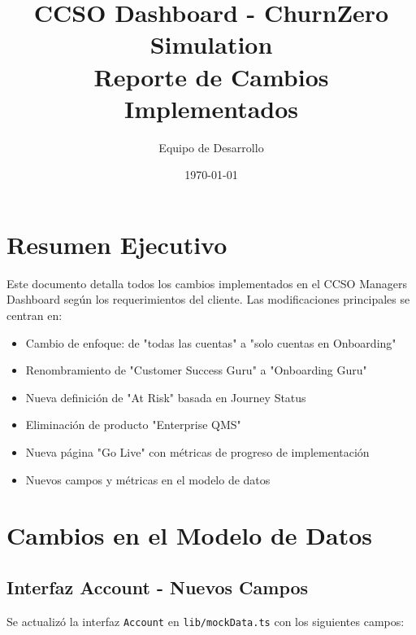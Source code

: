 \documentclass[12pt,a4paper]{article}
\title{\textbf{CCSO Dashboard - ChurnZero Simulation} \\ \large Reporte de Cambios Implementados}
\author{Equipo de Desarrollo}
\date{\today}
\begin{document}
\maketitle
\newpage

\tableofcontents
\newpage

\section{Resumen Ejecutivo}

Este documento detalla todos los cambios implementados en el CCSO Managers Dashboard según los requerimientos del cliente. Las modificaciones principales se centran en:

\begin{itemize}
    \item Cambio de enfoque: de "todas las cuentas" a "solo cuentas en Onboarding"
    \item Renombramiento de "Customer Success Guru" a "Onboarding Guru"
    \item Nueva definición de "At Risk" basada en Journey Status
    \item Eliminación de producto "Enterprise QMS"
    \item Nueva página "Go Live" con métricas de progreso de implementación
    \item Nuevos campos y métricas en el modelo de datos
\end{itemize}

\section{Cambios en el Modelo de Datos}

\subsection{Interfaz Account - Nuevos Campos}

Se actualizó la interfaz \texttt{Account} en \texttt{lib/mockData.ts} con los siguientes campos:
\end{document}
